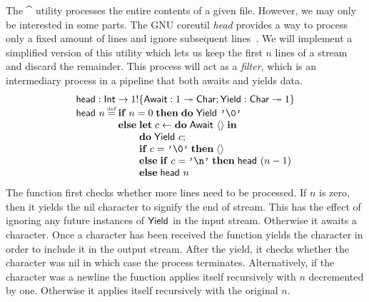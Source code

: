 \documentclass[12pt,phd,lfcs,twoside,openright,logo,leftchapter,normalheadings]{infthesis}
\theoremstyle{plain}
\theoremstyle{definition}
\begin{document}
The $\cat$ utility processes the entire contents of a given
file. However, we may only be interested in some parts. The GNU
coreutil \emph{head} provides a way to process only a fixed amount of
lines and ignore subsequent
lines~\cite[Section~5.1]{MacKenzieMPPBYS20}.
%
We will implement a simplified version of this utility which lets us
keep the first $n$ lines of a stream and discard the remainder. This
process will act as a \emph{filter}, which is an intermediary process
in a pipeline that both awaits and yields data.
%
\[
  \bl
  \head : \Int \to \UnitType \eff \{\Await : \UnitType \opto \Char;\Yield : \Char \opto \UnitType\}\\
  \head~n \defas
    \bl
    \If\;n = 0\;\Then\;\Do\;\Yield~\charlit{\textnil}\\
    \Else\;
      \bl
        \Let\;c \revto \Do\;\Await~\Unit\;\In\\
        \Do\;\Yield~c;\\
        \If\;c = \charlit{\textnil}\;\Then\;\Unit\\
        \Else\;\If\;c = \charlit{\nl}\;\Then\;\head~(n-1)\\
        \Else\;\head~n
     \el
    \el
  \el
\]
%
The function first checks whether more lines need to be processed. If
$n$ is zero, then it yields the nil character to signify the end of
stream. This has the effect of ignoring any future instances of
$\mathsf{Yield}$ in the input stream. Otherwise it awaits a character. Once a
character has been received the function yields the character in order
to include it in the output stream. After the yield, it checks whether
the character was nil in which case the process
terminates. Alternatively, if the character was a newline the function
applies itself recursively with $n$ decremented by one. Otherwise it
applies itself recursively with the original $n$.
\end{document}

